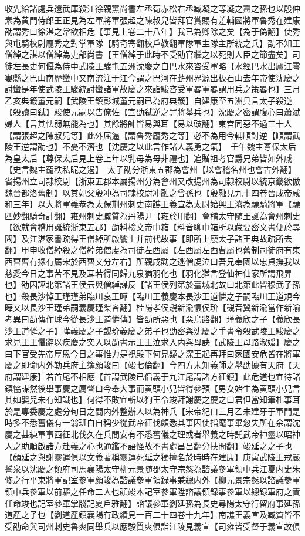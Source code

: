 收先給諸處兵還武庫殺江徐親黨尚書左丞荀赤松右丞臧凝之等凝之燾之孫也以殷仲素為黄門侍郎王正見為左軍將軍張超之陳叔兒皆拜官賞賜有差輔國將軍魯秀在建康劭謂秀曰徐湛之常欲相危【事見上卷二十八年】我已為卿除之矣【為于偽翻】使秀與屯騎校尉龎秀之對掌軍隊【騎奇寄翻校戶教翻軍隊軍主隊主所統之兵】劭不知王僧綽之謀以僧綽為吏部尚書【王僧綽于此時不受劭官繼之以死則人臣之節盡矣】司徒左長史何偃為侍中武陵王駿屯五洲沈慶之自巴水來咨受軍略【水經巴水出廬江雩婁縣之巴山南歷蠻中又南流注于江今謂之巴河在蘄州界源出板石山去年帝使沈慶之討蠻是年使武陵王駿統討蠻諸軍故慶之來詣駿咨受軍畧軍畧謂用兵之策畧也】三月乙亥典籖董元嗣【武陵王鎮彭城董元嗣已為府典籖】自建康至五洲具言太子殺逆【殺讀曰弑】駿使元嗣以告僚佐【宣劭弑逆之罪將舉兵也】沈慶之密謂腹心曰蕭斌婦人【言其怯弱無能為也】其餘將帥皆易與耳【易以豉翻】東宫同惡不過三十人【謂張超之陳叔兒等】此外屈逼【謂魯秀龎秀之等】必不為用今輔順討逆【順謂武陵王逆謂劭也】不憂不濟也【沈慶之以此言作諸人義勇之氣】　壬午魏主尊保太后為皇太后【尊保太后見上卷上年以乳母為母非禮也】追贈祖考官爵兄弟皆如外戚【史言魏主寵秩私昵之遏】　太子劭分浙東五郡為會州【以會稽名州也會古外翻】省揚州立司隸校尉【浙東五郡本屬揚州分為會州又改揚州為司隸校尉以統京畿欲倣魏晉都洛舊制】以其妃父殷冲為司隸校尉冲融之曾孫也【殷融見九十四卷晉成帝咸和三年】以大將軍義恭為太保荆州刺史南譙王義宣為太尉始興王濬為驃騎將軍【驃匹妙翻騎奇計翻】雍州刺史臧質為丹陽尹【雍於用翻】會稽太守随王誕為會州刺史【欲就會稽用誕統浙東五郡】劭料檢文帝巾箱【料音聊巾箱所以藏要密文書便於尋閲】及江湛家書疏得王僧綽所啟饗士并前代故事【即所上廢太子諸王典故疏所去翻】甲申收僧綽殺之僧綽弟僧䖍為司徒左西屬【左西屬左西曹屬也舊制司徒府有東西曹曹有掾有屬宋於西曹又分左右】所親咸勸之逃僧䖍泣曰吾兄奉國以忠貞撫我以慈愛今日之事苦不見及耳若得同歸九泉猶羽化也【羽化猶言登仙神仙家所謂飛昇也】劭因誣北第諸王侯云與僧綽謀反【諸王侯列第於臺城北故曰北第此皆穆武子孫也】殺長沙悼王瑾瑾弟臨川哀王曄【臨川王義慶本長沙王道憐之子嗣臨川王道規今曄又以長沙王瑾弟嗣義慶瑾渠吝翻】桂陽孝侯覬新渝懷侯玠【覬音冀新渝當作新喻　考異曰劭傳作球今從長沙王道憐傳】皆劭所惡也【惡烏路翻】瑾義欣之子【義欣長沙王道憐之子】曄義慶之子覬玠義慶之弟子也劭密與沈慶之手書令殺武陵王駿慶之求見王王懼辭以疾慶之突入以劭書示王王泣求入内與母訣【武陵王母路淑媛】慶之曰下官受先帝厚恩今日之事惟力是視殿下何見疑之深王起再拜曰家國安危皆在將軍慶之即命内外勒兵府主簿顔竣曰【竣七倫翻】今四方未知義師之舉劭據有天府【天府謂建康】若首尾不相應【首謂武陵已倡義于九江尾謂諸方征鎮】此危道也宜待諸鎮恊謀然後舉事慶之厲聲曰今舉大事而黄頭小兒皆得參預【男女始生為黄頭小兒言其如嬰兒未有知識也】何得不敗宜斬以狥王令竣拜謝慶之慶之曰君但當知筆札事耳於是專委慶之處分旬日之間内外整辦人以為神兵【宋帝紀曰三月乙未建牙于軍門是時多不悉舊儀有一翁班白自稱少從武帝征伐頗悉其事因使指麾事畢忽失所在余謂沈慶之甚練軍事西征北伐久在兵間安有不悉舊儀之理或者舉義之時託武帝神靈以昭神人之助順啟諸方赴義之心也通鑑不語怪故不書處昌呂翻分扶問翻】竣延之之子也【顔延之與謝靈運俱以文義著稱靈運死延之獨擅名於時時在建康】庚寅武陵王戒嚴誓衆以沈慶之領府司馬襄陽太守柳元景随郡太守宗慤為諮議參軍領中兵江夏内史朱修之行平東將軍記室參軍顔竣為諮議參軍領録事兼總内外【柳元景宗慤以諮議參軍領中兵參軍以前驅之任命二人也顔竣本記室參軍陞諮議領録事參軍以總録軍府之責任命竣也記室參軍掌牋記夏戶雅翻】諮議參軍劉延孫為長史尋陽太守行留府事延孫道產之子也【劉道產鎮襄陽有政績見一百二十四卷十九年】南譙王義宣及臧質皆不受劭命與司州刺史魯爽同舉兵以應駿質爽俱詣江陵見義宣【司雍皆受督于義宣故俱
